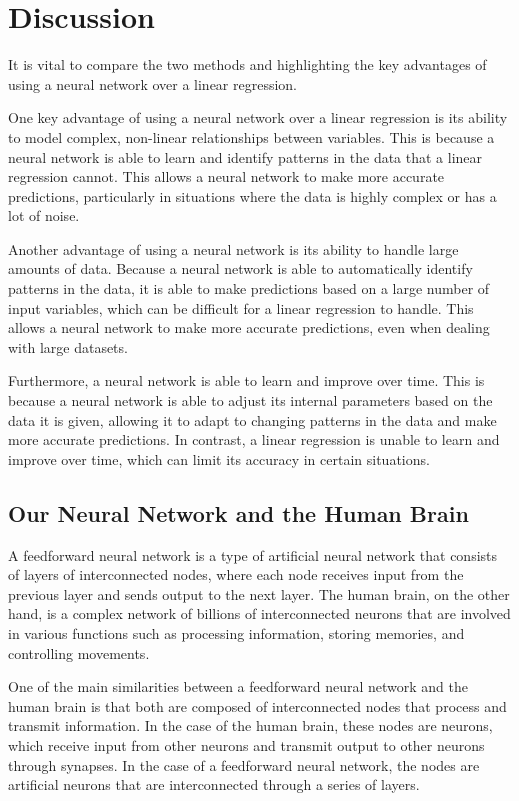 \documentclass[11pt]{article}
\begin{document}
\section{Discussion}
It is vital to compare the two methods and highlighting the key advantages of using a neural network over a linear regression.

One key advantage of using a neural network over a linear regression is its ability to model complex, non-linear relationships between variables. This is because a neural network is able to learn and identify patterns in the data that a linear regression cannot. This allows a neural network to make more accurate predictions, particularly in situations where the data is highly complex or has a lot of noise.

Another advantage of using a neural network is its ability to handle large amounts of data. Because a neural network is able to automatically identify patterns in the data, it is able to make predictions based on a large number of input variables, which can be difficult for a linear regression to handle. This allows a neural network to make more accurate predictions, even when dealing with large datasets.

Furthermore, a neural network is able to learn and improve over time. This is because a neural network is able to adjust its internal parameters based on the data it is given, allowing it to adapt to changing patterns in the data and make more accurate predictions. In contrast, a linear regression is unable to learn and improve over time, which can limit its accuracy in certain situations.

\subsection{Our Neural Network and the Human Brain}
A feedforward neural network is a type of artificial neural network that consists of layers of interconnected nodes, where each node receives input from the previous layer and sends output to the next layer. The human brain, on the other hand, is a complex network of billions of interconnected neurons that are involved in various functions such as processing information, storing memories, and controlling movements.

One of the main similarities between a feedforward neural network and the human brain is that both are composed of interconnected nodes that process and transmit information. In the case of the human brain, these nodes are neurons, which receive input from other neurons and transmit output to other neurons through synapses. In the case of a feedforward neural network, the nodes are artificial neurons that are interconnected through a series of layers.
\end{document}
